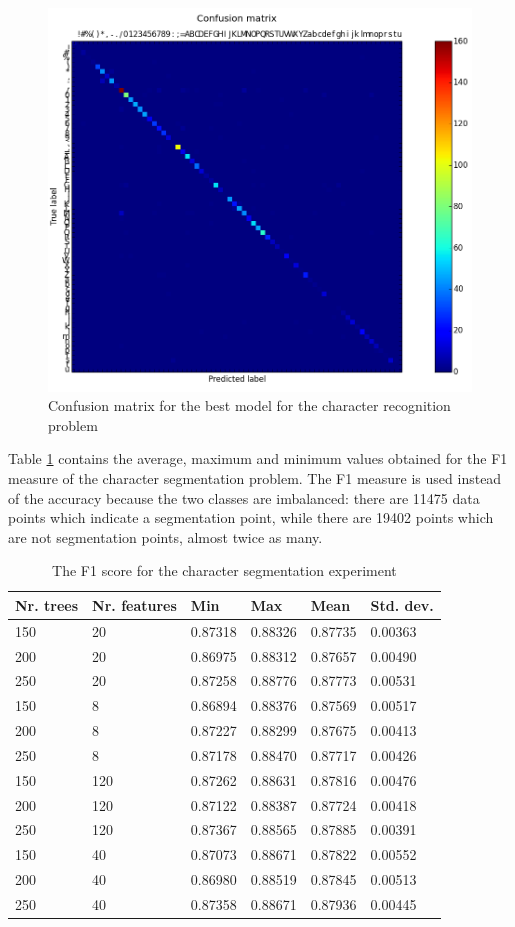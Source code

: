 \begin{figure}[h!]
\begin{center}
\includegraphics[width=0.8\linewidth]{img/rec_cm.png}
\caption{\label{fig:conf_matrix}
Confusion matrix for the best model for the character recognition problem}
\end{center}
\end{figure}

Table \ref{table:seg_values} contains the average, maximum and minimum values obtained for the F1 measure\cite{fawcett2006introduction} of the character segmentation problem. The F1 measure is used instead of the accuracy because the two classes are imbalanced: there are 11475 data points which indicate a segmentation point, while there are 19402 points which are not segmentation points, almost twice as many. 

\begin{table}[h]
\caption{The F1 score for the character segmentation experiment}
\label{table:seg_values}
\begin{tabular}{llllll}
\hline
Nr. trees & Nr. features & Min     & Max     & Mean    & Std. dev. \\ \hline
150 & 20 & 0.87318 & 0.88326 & 0.87735 & 0.00363 \\ 
200 & 20 & 0.86975 & 0.88312 & 0.87657 & 0.00490 \\ 
250 & 20 & 0.87258 & 0.88776 & 0.87773 & 0.00531 \\ 
150 & 8 & 0.86894 & 0.88376 & 0.87569 & 0.00517 \\ 
200 & 8 & 0.87227 & 0.88299 & 0.87675 & 0.00413 \\ 
250 & 8 & 0.87178 & 0.88470 & 0.87717 & 0.00426 \\ 
150 & 120 & 0.87262 & 0.88631 & 0.87816 & 0.00476 \\ 
200 & 120 & 0.87122 & 0.88387 & 0.87724 & 0.00418 \\ 
250 & 120 & 0.87367 & 0.88565 & 0.87885 & 0.00391 \\ 
150 & 40 & 0.87073 & 0.88671 & 0.87822 & 0.00552 \\ 
200 & 40 & 0.86980 & 0.88519 & 0.87845 & 0.00513 \\ 
250 & 40 & 0.87358 & 0.88671 & 0.87936 & 0.00445 \\  \hline
\end{tabular}
\end{table}


